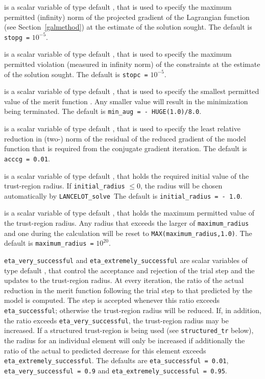 \documentclass{galahad}
\newcommand{\fullpackagename}{LANC\-E\-LOT}
\newcommand{\solver}{{\tt \fullpackagename\_solve}}
\begin{document}
\begin{description}
 is a scalar variable of type default \realdp,
that is used to specify the maximum permitted (infinity)
norm of the projected gradient of the Lagrangian function
(see Section~\ref{galmethod}) at the estimate of the solution sought.
The default is {\tt stopg =} $10^{-5}$.

 is a scalar variable of type default \realdp, that is used to
specify the maximum permitted violation (measured in infinity
norm) of the constraints at the estimate of the solution sought.
The default is {\tt stopc =} $10^{-5}$.

 is a scalar variable of type default \realdp, that is used
to specify the smallest permitted value of the merit function
. Any smaller value will result in the minimization
being terminated. The default is {\tt min\_aug = - HUGE(1.0)/8.0}.

 is a scalar variable of type default \realdp, that is used to
specify the least relative reduction in (two-) norm of the residual
of the reduced gradient of the model function that is required
from the conjugate gradient iteration.
The default is {\tt acccg = 0.01}.

 is a scalar variable of type default \realdp, that holds
the required initial value of the trust-region radius. If
{\tt initial\_radius} $\leq 0$, the radius will be chosen automatically
by \solver\
The default is {\tt initial\_radius = - 1.0}.

 is a scalar variable of type default \realdp, that holds
the maximum permitted value of the trust-region radius. Any radius that
exceeds the larger of {\tt maximum\_radius} and one
during the calculation will be reset to
{\tt MAX(maximum\_radius,1.0)}.
The default is {\tt maximum\_radius =} $10^{20}$.

 {\tt eta\_very\_successful}
and {\tt eta\_extremely\_successful} are scalar variables of type default
\realdp, that control the acceptance and rejection of the trial step
and the updates to the trust-region radius.
At every iteration, the ratio of the actual reduction in the merit function
following the trial step to that predicted by the model is computed.
The step is accepted whenever this ratio exceeds {\tt eta\_successful};
otherwise the trust-region radius will be reduced.
If, in addition, the ratio exceeds {\tt eta\_very\_successful}, the trust-region
radius may be increased. If a structured trust-region is being used
(see {\tt structured\_tr} below), the radius for an individual element
will only be increased if additionally the ratio of the actual to
predicted decrease for this element exceeds {\tt eta\_extremely\_successful}.
The defaults are
{\tt eta\_successful = 0.01},
{\tt eta\_very\_successful = 0.9} and
{\tt eta\_extremely\_successful = 0.95}.


\end{description}
\end{document}
